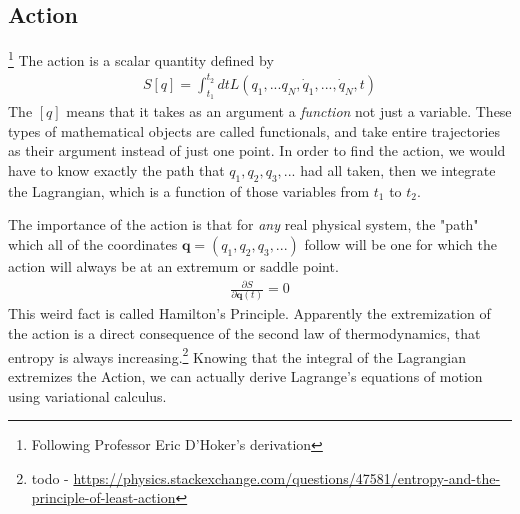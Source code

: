 \subsection{Action}\footnote{Following Professor Eric D'Hoker's derivation}
The action is a scalar quantity defined by
\begin{align}
S[q] = \int_{t_1}^{t_2} dt L (q_1,...q_N, \dot{q}_1, ..., \dot{q}_N, t)
\end{align}
The $[q]$ means that it takes as an argument a \emph{function} not just a variable. These types of mathematical objects are called functionals, and take entire trajectories as their argument instead of just one point. In order to find the action, we would have to know exactly the path that $q_1, q_2, q_3, ...$ had all taken, then we integrate the Lagrangian, which is a function of those variables from $t_1$ to $t_2$. 



The importance of the action is that for \emph{any} real physical system, the "path" which all of the coordinates $\textbf{q} = (q_1,q_2,q_3,...)$ follow will be one for which the action will always be at an extremum or saddle point.
\begin{align}
    \frac{\partial S}{\partial \textbf{q}(t)} = 0
\end{align}
This weird fact is called Hamilton's Principle. Apparently the extremization of the action is a direct consequence of the second law of thermodynamics, that entropy is always increasing.\footnote{todo - \url{https://physics.stackexchange.com/questions/47581/entropy-and-the-principle-of-least-action}} Knowing that the integral of the Lagrangian extremizes the Action, we can actually derive Lagrange's equations of motion using variational calculus.

